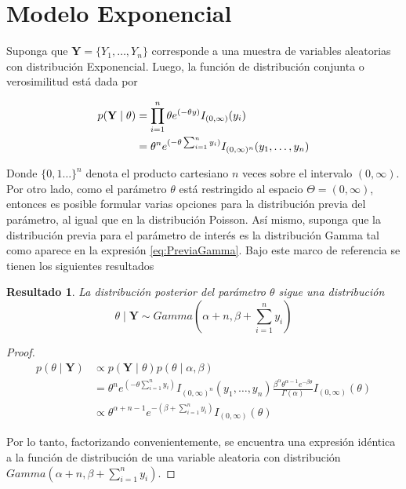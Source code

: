 \documentclass[
  10pt,
  spanish,
]{book}
\newtheorem{proposition}{Resultado}[chapter]
\theoremstyle{definition}
\theoremstyle{definition}
\theoremstyle{definition}
\theoremstyle{definition}
\theoremstyle{remark}
\begin{document}
\hypertarget{modelo-exponencial}{%
\section{Modelo Exponencial}\label{modelo-exponencial}}

Suponga que \(\mathbf{Y}=\{Y_1,\ldots,Y_n\}\) corresponde a una muestra de variables aleatorias con distribución Exponencial. Luego, la función de distribución conjunta o verosimilitud está dada por

\begin{align}
p(\mathbf{Y} \mid \theta)&=\prod_{i=1}^n\theta e^{(-\theta y)}I_{(0,\infty)}(y_i) \notag \\
&=\theta^n e^{(-\theta \sum_{i=1}^ny_i)}I_{(0,\infty)^n}(y_1,\ldots,y_n)
\end{align}

Donde \(\{0,1\ldots\}^n\) denota el producto cartesiano \(n\) veces sobre el intervalo \((0,\infty)\). Por otro lado, como el parámetro \(\theta\) está restringido al espacio \(\Theta=(0,\infty)\), entonces es posible formular varias opciones para la distribución previa del parámetro, al igual que en la distribución Poisson. Así mismo, suponga que la distribución previa para el parámetro de interés es la distribución Gamma tal como aparece en la expresión \eqref{eq:PreviaGamma}. Bajo este marco de referencia se tienen los siguientes resultados

\begin{proposition}
\protect\hypertarget{prp:unnamed-chunk-53}{}{\label{prp:unnamed-chunk-53} }La distribución posterior del parámetro \(\theta\) sigue una distribución
\begin{equation*}
\theta \mid \mathbf{Y} \sim Gamma\left(\alpha+n,\beta+\sum_{i=1}^ny_i\right)
\end{equation*}
\end{proposition}

\begin{proof}
{}\begin{align*}
p(\theta \mid \mathbf{Y})&\propto p(\mathbf{Y} \mid \theta)p(\theta \mid \alpha,\beta)\\
&=\theta^n e^{(-\theta \sum_{i=1}^ny_i)}I_{(0,\infty)^n}(y_1,\ldots,y_n)\frac{\beta^\alpha \theta^{\alpha-1} e^{-\beta\theta}}{\Gamma(\alpha)}I_{(0,\infty)}(\theta)\\
&\propto \theta^{\alpha+n-1}e^{-(\beta+\sum_{i=1}^ny_i)}I_{(0,\infty)}(\theta)
\end{align*}

Por lo tanto, factorizando convenientemente, se encuentra una expresión idéntica a la función de distribución de una variable aleatoria con distribución \(Gamma(\alpha+n,\beta+\sum_{i=1}^ny_i)\).
\end{proof}
\end{document}
